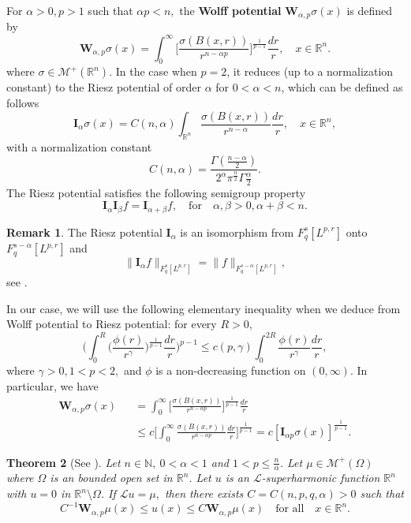 \documentclass[12pt]{amsart}
\newcommand{\R}{\mathbb{R}}
\newcommand{\N}{\mathbb{N}}
\newcommand{\be}{\begin{equation}}
\newcommand{\ee}{\end{equation}}
\newcommand{\bea}{\begin{eqnarray}}
\newcommand{\eea}{\end{eqnarray}}
\numberwithin{equation}{section}
\theoremstyle{plain}
\newtheorem{Thm}{Theorem}[section]
\theoremstyle{definition}
\newtheorem{Rem}[Thm]{Remark}
\theoremstyle{remark}
\begin{document}
For $\alpha>0, p>1$ such that $\alpha p<n,$ the \textbf{Wolff potential} $\mathbf{W}_{\alpha,p}\sigma(x)$ is defined by
\[
 \mathbf{W}_{\alpha,p}\sigma(x)=\int_{0}^{\infty} \Big[\frac{\sigma(B(x,r))}{r^{n-\alpha p} }\Big]^{\frac{1}{p-1}}\frac{dr}{r},\quad x\in\R^{n}.
 \]
where $\sigma\in\mathcal{M}^{+}(\R^{n})$. In the case when $p=2$, it reduces (up to a normalization constant) to the Riesz potential of order $\alpha$ for $0<\alpha<n$, which can be defined as follows
 \[
 \mathbf{I}_{\alpha}\sigma(x)=C(n,\alpha)\int_{\R^{n}}\frac{\sigma(B(x,r))}{r^{n-\alpha}}\frac{dr}{r},\quad x\in \R^{n},
 \]
with a normalization constant
\[
C(n,\alpha)=\frac{\Gamma(\frac{n-\alpha}{2})}{2^{\alpha}\pi^{\frac{n}{2}}\Gamma\frac{\alpha}{2}}.
\] 
The Riesz potential satisfies the following semigroup property 
\[
\mathbf{I}_{\alpha}\mathbf{I}_{\beta}f=\mathbf{I}_{\alpha+\beta}f,\quad\text{for}\quad \alpha,\beta>0, \alpha+\beta<n.
\]
\begin{Rem}
The Riesz potential $\mathbf{I}_{\alpha}$ is an isomorphism from $F^{s}_{q}[L^{p,r}]$ onto $F^{s-\alpha}_{q}[L^{p,r}]$ and 
\be\label{riesz}
\|\mathbf{I}_{\alpha}f\|_{F^{s}_{q}[L^{p,r}]}=\|f\|_{F^{s-\alpha}_{q}[L^{p,r}]},
\ee
see \cite{BCT}.
\end{Rem}
In our case, we will use the following elementary inequality when we deduce from Wolff potential to Riesz potential: for every $R>0$,
\[
\Big( \int_{0}^{R}\big( \frac{\phi(r)}{r^{\gamma}}\big)^{\frac{1}{p-1}}\frac{dr}{r}\Big)^{p-1}\leq c(p,\gamma)\int_{0}^{2R}\frac{\phi(r)}{r^{\gamma}}\frac{dr}{r},
\]
where $\gamma>0, 1<p<2,$ and $\phi$ is a non-decreasing function on $(0,\infty)$. In particular, we have
	\bea\label{ineq}
\mathbf{W}_{\alpha,p}\sigma(x)&&=\int_{0}^{\infty} \Big[\frac{\sigma(B(x,r))}{r^{n-\alpha p} }\Big]^{\frac{1}{p-1}}\frac{dr}{r}\nonumber\\
&&\leq c \Big[ \int_{0}^{\infty}\frac{\sigma(B(x,r))}{r^{n-\alpha p} }\frac{dr}{r}\Big]^{\frac{1}{p-1}}=c[\mathbf{I}_{\alpha p}\sigma(x)]^{\frac{1}{p-1}}.
\eea
\begin{Thm}[{\text See \cite{MKS}}] \label{Pointwiseupperbound}
Let $n\in\N,\ 0<\alpha<1$ and $1<p\leq\frac{n}{\alpha}$. Let $\mu\in\mathcal{M}^{+}(\Omega)$ where $\Omega$ is an bounded open set in $\R^{n}$. Let $u$ is an $\mathcal{L}$-superharmonic function $\R^{n}$ with $u=0$ in $\R^{n}\setminus\Omega$. If $\mathcal{L}u=\mu,$ then there exists $C=C(n,p,q,\alpha)>0$ such that
\[\label{global}
C^{-1}\mathbf{W}_{\alpha,p}\mu(x)\leq u(x)\leq C \mathbf{W}_{\alpha,p}\mu(x)\quad\text{for all}\quad x\in\R^{n}.
\]
\end{Thm}
\end{document}
